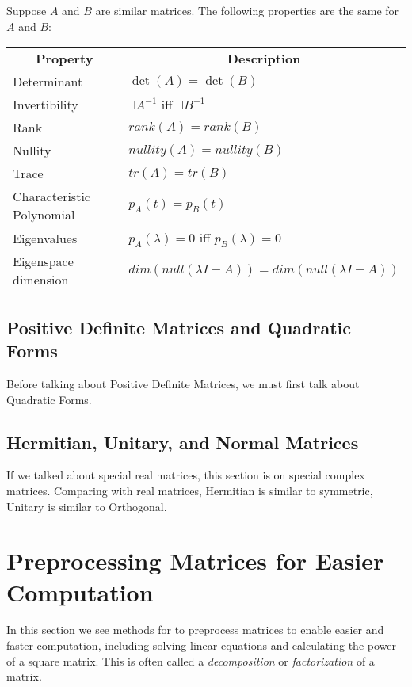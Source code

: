 \documentclass{report}
\begin{document}
		\begin{thm}
			Suppose $A$ and $B$ are similar matrices. The following properties are the same for $A$ and $B$: \\
			\begin{tabular}{ll}
				\multicolumn{1}{c}{\textbf{Property}} & \multicolumn{1}{c}{\textbf{Description}}             \\
				Determinant                           & $\det(A)=\det(B)$                                    \\
				Invertibility                         & $\exists A^{-1}$ iff $\exists B^{-1}$                \\
				Rank                                  & $rank(A)=rank(B)$                                    \\
				Nullity                               & $nullity(A)=nullity(B)$                              \\
				Trace                                 & $tr(A)=tr(B)$                                        \\
				Characteristic Polynomial             & $p_A(t)=p_B(t)$                                      \\
				Eigenvalues                           & $p_A(\lambda)=0$ iff $p_B(\lambda)=0$                \\
				Eigenspace dimension                  & $dim(null(\lambda I-A))=dim(null(\lambda I-A))$
			\end{tabular}
		\end{thm}
		
		\subsection{Positive Definite Matrices and Quadratic Forms}
		Before talking about Positive Definite Matrices, we must first talk about Quadratic Forms.
		
		\subsection{Hermitian, Unitary, and Normal Matrices}
		If we talked about special real matrices, this section is on special complex matrices. Comparing with real matrices, Hermitian is similar to symmetric, Unitary is similar to Orthogonal.
	
	\section{Preprocessing Matrices for Easier Computation}
	In this section we see methods for to preprocess matrices to enable easier and faster computation, including solving linear equations and calculating the power of a square matrix. This is often called a \emph{decomposition} or \emph{factorization} of a matrix.
	
\end{document}

